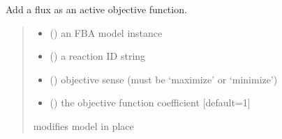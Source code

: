 \documentclass[letterpaper,12pt,english]{sphinxmanual}
\begin{document}
\begin{fulllineitems}
\label{\detokenize{api/core:cbmpy.CBTools.addFluxAsActiveObjective}}
\pysigstartsignatures
\pysiglinewithargsret
{}
{\sphinxparamcomma {}\sphinxparamcomma {}\sphinxparamcomma {}}
{}
\pysigstopsignatures
\sphinxAtStartPar
Add a flux as an active objective function.
\begin{quote}\begin{description}
\begin{itemize}
\item {} 
\sphinxAtStartPar
{} () \textendash{} an FBA model instance

\item {} 
\sphinxAtStartPar
{} () \textendash{} a reaction ID string

\item {} 
\sphinxAtStartPar
{} () \textendash{} objective sense (must be ‘maximize’ or ‘minimize’)

\item {} 
\sphinxAtStartPar
{} (\sphinxstyleliteralemphasis{\sphinxupquote{, }}) \textendash{} the objective function coefficient {[}default=1{]}

\end{itemize}

\sphinxAtStartPar
{} \textendash{} modifies model in place

\end{description}\end{quote}

\end{fulllineitems}
\end{document}
